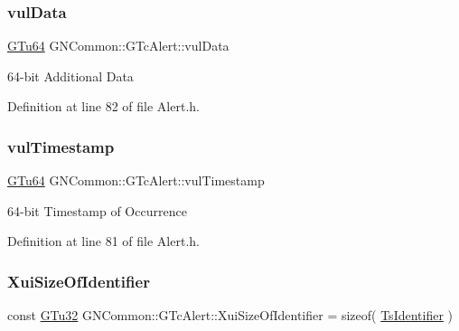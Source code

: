 \subsubsection{\texorpdfstring{vul\+Data}{vulData}}
{\footnotesize\ttfamily \mbox{\hyperlink{namespace_g_n_common_a01e8527dabf7ab4f123156b0701945eb}{G\+Tu64}} G\+N\+Common\+::\+G\+Tc\+Alert\+::vul\+Data\hspace{0.3cm}{\ttfamily [protected]}}

64-\/bit Additional Data 

Definition at line 82 of file Alert.\+h.

\mbox{\label{class_g_n_common_1_1_g_tc_alert_acc753824948e4d169e7af7083ced87a0}} 
\subsubsection{\texorpdfstring{vul\+Timestamp}{vulTimestamp}}
{\footnotesize\ttfamily \mbox{\hyperlink{namespace_g_n_common_a01e8527dabf7ab4f123156b0701945eb}{G\+Tu64}} G\+N\+Common\+::\+G\+Tc\+Alert\+::vul\+Timestamp\hspace{0.3cm}{\ttfamily [protected]}}

64-\/bit Timestamp of Occurrence 

Definition at line 81 of file Alert.\+h.

\mbox{\label{class_g_n_common_1_1_g_tc_alert_a17e549148a2f549495b0e8567f546e81}} 
\subsubsection{\texorpdfstring{Xui\+Size\+Of\+Identifier}{XuiSizeOfIdentifier}}
{\footnotesize\ttfamily const \mbox{\hyperlink{namespace_g_n_common_ae5485474bc8f23e462e920a17b377b53}{G\+Tu32}} G\+N\+Common\+::\+G\+Tc\+Alert\+::\+Xui\+Size\+Of\+Identifier = sizeof( \mbox{\hyperlink{struct_g_n_common_1_1_g_tc_alert_1_1_ts_identifier}{Ts\+Identifier}} )\hspace{0.3cm}{\ttfamily [static]}}

